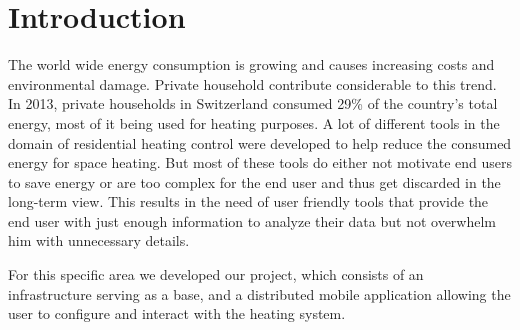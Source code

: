 
\chapter{Introduction}
\label{sec:introduction}



The world wide energy consumption is growing and causes increasing costs and environmental damage.
Private household contribute considerable to this trend.
In 2013, private households in Switzerland consumed 29\% of the country's total energy\cite{schweizerischeGesamtenergiestatistik2013}, most of it being used for heating purposes\cite{analyseEnergieverbrauchVerwendungszwecke2013}.
A lot of different tools in the domain of residential heating control were developed to help reduce the consumed energy for space heating.
But most of these tools do either not motivate end users to save energy or are too complex for the end user and thus get discarded in the long-term view.
This results in the need of user friendly tools that provide the end user with just enough information to analyze their data but not overwhelm him with unnecessary details.


For this specific area we developed our project, which consists of an infrastructure serving as a base, and a distributed mobile application allowing the user to configure and interact with the heating system.

